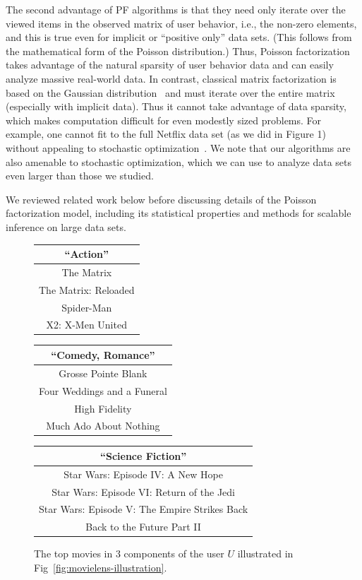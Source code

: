 The second advantage of PF algorithms is that they need only iterate
over the viewed items in the observed matrix of user behavior, i.e.,
the non-zero elements, and this is true even for implicit or
``positive only'' data sets.  (This follows from the mathematical form
of the Poisson distribution.)  Thus, Poisson factorization takes
advantage of the natural sparsity of user behavior data and can easily
analyze massive real-world data. In contrast, classical matrix
factorization is based on the Gaussian
distribution~\cite{Salakhutdinov:2008} and must iterate over the
entire matrix (especially with implicit data).  Thus it cannot take
advantage of data sparsity, which makes computation difficult for even
modestly sized problems.  For example, one cannot fit to the full
Netflix data set (as we did in Figure 1) without appealing to
stochastic optimization~\cite{Mairal:2010}.  We note that our
algorithms are also amenable to stochastic optimization, which we can
use to analyze data sets even larger than those we studied.


We reviewed related work below before discussing details of the
Poisson factorization model, including its statistical properties and
methods for scalable inference on large data sets.

\begin{figure}[th]
\centering
\caption{The top movies in 3 components of the user $U$ illustrated in
  Fig~\ref{fig:movielens-illustration}.}
\vspace{0.1cm}
\small
\begin{tabular}{c}
\toprule
\bf{``Action''}\\
\midrule
The Matrix\\
The Matrix: Reloaded\\
Spider-Man\\
X2: X-Men United\\
\bottomrule
\end{tabular}
\begin{tabular}{c}
\toprule
\bf{``Comedy, Romance''}\\
\midrule
Grosse Pointe Blank\\
Four Weddings and a Funeral\\
High Fidelity\\
Much Ado About Nothing\\
\bottomrule
\end{tabular}
\begin{tabular}{c}
\toprule
\bf{``Science Fiction''}\\
\midrule
Star Wars: Episode IV: A New Hope\\
Star Wars: Episode VI: Return of the Jedi\\
Star Wars: Episode V: The Empire Strikes Back\\
Back to the Future Part II\\
\bottomrule
\end{tabular}
\end{figure}

